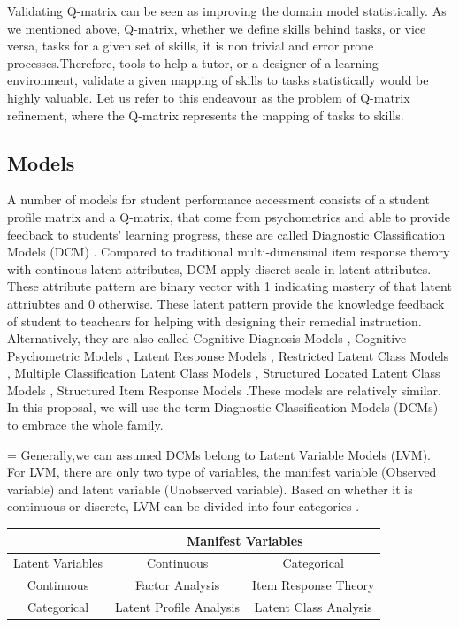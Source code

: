 \documentclass[11pt]{article}
\begin{document}
  Validating Q-matrix can be seen as improving the domain model statistically. As we mentioned above, Q-matrix, whether we define skills behind tasks, or vice versa, tasks for a given set of skills, it is non trivial and error prone processes.Therefore, tools to help a tutor, or a designer of a learning environment, validate a given mapping of skills to tasks statistically would be highly valuable. Let us refer to this endeavour as the problem of Q-matrix refinement, where the Q-matrix represents the mapping of tasks to skills.

\subsection{Models}
A number of models for student performance accessment consists of  a student profile matrix and a Q-matrix, that come from psychometrics and able to provide feedback to students' learning progress, these are called Diagnostic Classification Models (DCM) \cite{templin2010diagnostic}. Compared to traditional multi-dimensinal item response therory with continous latent attributes, DCM apply discret scale in latent attributes. These attribute pattern are binary vector with 1 indicating  mastery of that latent attriubtes and 0 otherwise. These latent pattern provide the knowledge feedback of student to teachears for helping with designing their remedial instruction. Alternatively, they are also called Cognitive Diagnosis Models \cite{templin2006measurement}, Cognitive Psychometric Models \cite{rupp2007answer}, Latent Response Models \cite{maris1995psychometric}, Restricted Latent Class Models \cite{haertel1989using}, Multiple Classification Latent Class Models \cite{maris1999estimating}, Structured Located Latent Class Models \cite{xu2008fitting}, Structured Item Response Models \cite{rupp2007cognitive}.These models are relatively similar. In this proposal, we will use the term Diagnostic Classification Models (DCMs) to embrace the whole family.

\parskip = \baselineskip
Generally,we can assumed DCMs belong to Latent Variable Models (LVM). For LVM, there are only two type of variables, the manifest variable (Observed variable) and latent variable (Unobserved variable). Based on whether it is continuous or discrete, LVM can be divided into four categories \cite{galbraith2002analysis}.

\begin{tabular}{|c||c|c|}
\hline
          {} & \multicolumn{2}{c|}{Manifest Variables}\\ \hline \hline
 Latent Variables & Continuous & Categorical  \\ \hline
 Continuous & Factor Analysis & Item Response Theory \\ \hline
 Categorical & Latent Profile Analysis & Latent Class Analysis \\ \hline
\end{tabular}
\\
\end{document}
